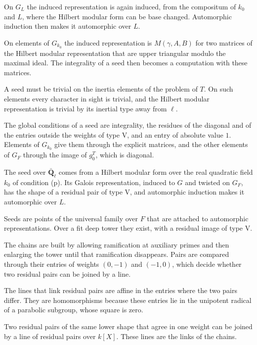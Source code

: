 On $G_L$ the induced representation is again induced, from the compositum of $k_0$ and $L$, where the Hilbert modular form can be base changed. Automorphic induction then makes it automorphic over $L$.

On elements of $G_{k_0}$ the induced representation is $M(\gamma,A,B)$ for two matrices of the Hilbert modular representation that are upper triangular modulo the maximal ideal. The integrality of a seed then becomes a computation with these matrices.

A seed must be trivial on the inertia elements of the problem of $T$. On such elements every character in sight is trivial, and the Hilbert modular representation is trivial by its inertial type away from $\ell$.

The global conditions of a seed are integrality, the residues of the diagonal and of the entries outside the weights of type V, and an entry of absolute value $1$. Elements of $G_{k_0}$ give them through the explicit matrices, and the other elements of $G_F$ through the image of $g_0^T$, which is diagonal.

The seed over $\bar{\mathbf Q}_\ell$ comes from a Hilbert modular form over the real quadratic field $k_0$ of condition (p). Its Galois representation, induced to $G$ and twisted on $G_F$, has the shape of a residual pair of type V, and automorphic induction makes it automorphic over $L$.

Seeds are points of the universal family over $F$ that are attached to automorphic representations. Over a fit deep tower they exist, with a residual image of type V.

The chains are built by allowing ramification at auxiliary primes and then enlarging the tower until that ramification disappears. Pairs are compared through their entries of weights $(0,-1)$ and $(-1,0)$, which decide whether two residual pairs can be joined by a line.

The lines that link residual pairs are affine in the entries where the two pairs differ. They are homomorphisms because these entries lie in the unipotent radical of a parabolic subgroup, whose square is zero.

Two residual pairs of the same lower shape that agree in one weight can be joined by a line of residual pairs over $k[X]$. These lines are the links of the chains.

